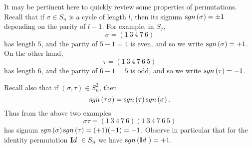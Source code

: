 It may be pertinent here to quickly review some properties of
permutations. Recall that if $\sigma \in S_n$ is a cycle of length
$l$, then its signum $\sgn{\sigma} = \pm 1$ depending on  the
parity of $l - 1$. For example, in $S_7$, $$\sigma = (1 \ 3 \ 4 \
7 \ 6)
$$has length $5$, and the parity of $5 - 1 = 4$ is even, and so we
write $\sgn{\sigma} = +1$. On the other hand, $$\tau = (1 \ 3 \ 4
\ 7 \ 6 \ 5)   $$has length $6$, and the parity of $6 - 1 = 5$ is
odd, and so we write $\sgn{\tau} = -1$.

\bigskip

Recall also that if $(\sigma, \tau)\in S_n ^2$, then
$$ \sgn{\tau\sigma} = \sgn{\tau}\sgn{\sigma}. $$ Thus from the
above two examples
$$\sigma\tau = (1 \ 3 \ 4 \
7 \ 6)(1 \ 3 \ 4 \ 7 \ 6\ 5)
$$has signum $\sgn{\sigma} \sgn{\tau} = (+1)(-1) = -1$. Observe in
particular that for the identity permutation ${\mathbf Id\ }\in S_n$ we
have $\sgn{\idefun} = +1$.

